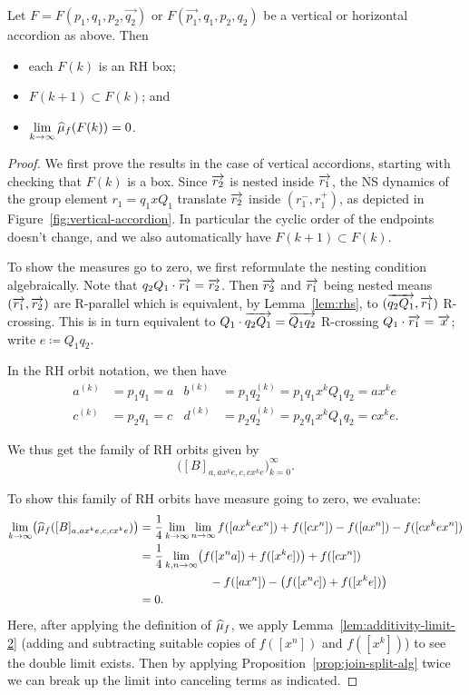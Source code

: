 \begin{proposition}
\label{prop:finalfamily}
  Let $F = F(p_1,q_1,p_2,\vec{q_2})$ or $F(\vec{p_1},q_1, p_2,q_2)$ be a vertical or horizontal accordion as above. Then
  \begin{itemize}
  \item each $F(k)$ is an RH box;
  \item $F(k+1) \subset F(k)$; and
  \item $\displaystyle \lim_{k \to \infty} \widehat{\mu}_f(F(k)) = 0$.
  \end{itemize}
\end{proposition}

\begin{proof}
  We first prove the results in the case of vertical accordions, starting with checking that $F(k)$ is a box. Since $\overrightarrow{r_2}$ is nested inside $\overrightarrow{r_1}$, the NS dynamics of the group element $r_1 = q_1 x Q_1$ translate $\overrightarrow{r_2}$ inside $(r_1^-,r_1^+)$, as depicted in Figure~\ref{fig:vertical-accordion}. In particular the cyclic order of the endpoints doesn't change, and we also automatically have $F(k+1) \subset F(k)$.

  To show the measures go to zero, we first reformulate the nesting condition algebraically. Note that $q_2Q_1 \cdot \overrightarrow{r_1} = \overrightarrow{r_2}$. Then $\overrightarrow{r_2}$ and $\overrightarrow{r_1}$ being nested means $(\overrightarrow{r_1},\overrightarrow{r_2})$ are R-parallel which is equivalent, by Lemma~\ref{lem:rhs}, to $(\overrightarrow{q_2Q_1}, \overrightarrow{r_1})$ R-crossing. This is in turn equivalent to $Q_1 \cdot \overrightarrow{q_2Q_1} = \overrightarrow{Q_1q_2}$ R-crossing $Q_1 \cdot \overrightarrow{r_1} = \overrightarrow{x}$; write $e \coloneqq Q_1q_2$.

  In the RH orbit notation, we then have
  \begin{align*}
    a^{(k)} &= p_1 q_1 = a &
    b^{(k)} &= p_1 q_2^{(k)} = p_1 q_1 x^k Q_1q_2 = a x^k e\\
    c^{(k)} &= p_2 q_1 = c &
    d^{(k)} &= p_2 q_2^{(k)} = p_2 q_1 x^k Q_1 q_2 = c x^k e.
  \end{align*}

We thus get the family of RH orbits given by
\[
\bigl([B]_{a,a x^k e,c,c x^k e}\bigr)_{k=0}^\infty.
\]

To show this family of RH orbits have measure going to zero, we
evaluate:
\begin{align*}
  \lim_{k \to \infty} \bigl(\widehat{\mu}_f([B]_{a,ax^ke,c,cx^ke})\bigr)
   &= \frac{1}{4}\lim_{k \to \infty} \lim_{n\to \infty} f([ax^ke x^n]) +
     f([cx^n])-f([ax^n])-f([cx^kex^n]) \\
  &= \frac{1}{4}\lim_{k,n \to \infty} \bigl(f([x^n a]) + f([x^ke])\bigr) + f([cx^n])\\
  &\qquad\qquad\qquad-f([ax^n])-\bigl(f([x^nc]) + f([x^ke])\bigr)\\
  &= 0.
\end{align*}
Here, after applying the definition of $\widehat{\mu}_f$, we apply
Lemma~\ref{lem:additivity-limit-2}
(adding and subtracting suitable copies of $f([x^n])$ and $f([x^k])$)
to see the double limit
exists. Then by applying Proposition~\ref{prop:join-split-alg} twice we
can break up the limit into canceling terms as indicated.


\end{proof}
